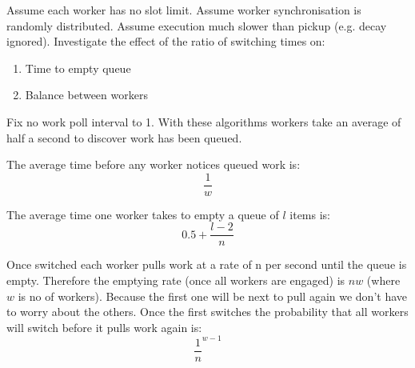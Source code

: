\documentclass{article}
\begin{document}
Assume each worker has no slot limit.
Assume worker synchronisation is randomly distributed.
Assume execution much slower than pickup (e.g. decay ignored).
Investigate the effect of the ratio of switching times on:
\begin{enumerate}
\item Time to empty queue
\item Balance between workers
\end{enumerate}
Fix no work poll interval to 1.
With these algorithms workers take an average of half a second to discover work has been queued.

The average time before any worker notices queued work is:
\begin{equation}
\frac{1}{w}
\end{equation}

The average time one worker takes to empty a queue of $l$ items is:
\begin{equation}
0.5 + \frac{l - 2}{n}
\end{equation}

Once switched each worker pulls work at a rate of n per second until the queue is empty.
Therefore the emptying rate (once all workers are engaged) is $nw$ (where $w$ is no of workers).
Because the first one will be next to pull again we don't have to worry about the others.
Once the first switches the probability that all workers will switch before it pulls work again is:
\begin{equation}
\frac{1}{n}^{w - 1}
\end{equation}
\end{document}
